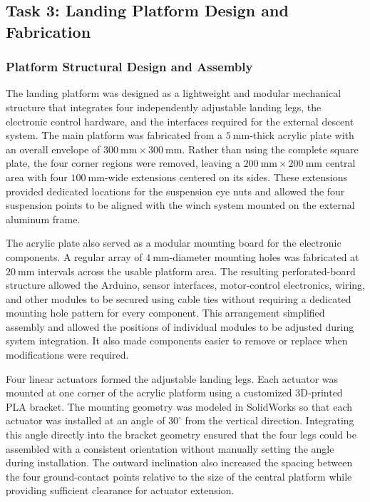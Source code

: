 \documentclass{engr1000j-s2}
\begin{document}
\newpage

\subsection{Task 3: Landing Platform Design and Fabrication}

\subsubsection{Platform Structural Design and Assembly}

The landing platform was designed as a lightweight and modular mechanical structure that integrates four independently adjustable landing legs, the electronic control hardware, and the interfaces required for the external descent system. The main platform was fabricated from a \(5~\mathrm{mm}\)-thick acrylic plate with an overall envelope of \(300~\mathrm{mm}\times300~\mathrm{mm}\). Rather than using the complete square plate, the four corner regions were removed, leaving a \(200~\mathrm{mm}\times200~\mathrm{mm}\) central area with four \(100~\mathrm{mm}\)-wide extensions centered on its sides. These extensions provided dedicated locations for the suspension eye nuts and allowed the four suspension points to be aligned with the winch system mounted on the external aluminum frame.

The acrylic plate also served as a modular mounting board for the electronic components. A regular array of \(4~\mathrm{mm}\)-diameter mounting holes was fabricated at \(20~\mathrm{mm}\) intervals across the usable platform area. The resulting perforated-board structure allowed the Arduino, sensor interfaces, motor-control electronics, wiring, and other modules to be secured using cable ties without requiring a dedicated mounting hole pattern for every component. This arrangement simplified assembly and allowed the positions of individual modules to be adjusted during system integration. It also made components easier to remove or replace when modifications were required.

Four linear actuators formed the adjustable landing legs. Each actuator was mounted at one corner of the acrylic platform using a customized 3D-printed PLA bracket. The mounting geometry was modeled in SolidWorks so that each actuator was installed at an angle of \(30^\circ\) from the vertical direction. Integrating this angle directly into the bracket geometry ensured that the four legs could be assembled with a consistent orientation without manually setting the angle during installation. The outward inclination also increased the spacing between the four ground-contact points relative to the size of the central platform while providing sufficient clearance for actuator extension.
\end{document}
